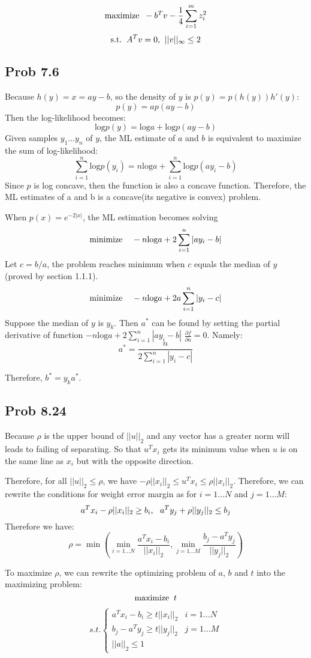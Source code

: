 \message{ !name(ass4_ChangLi.tex)}\documentclass[10pt,a4paper]{article}
\begin{document}
$$\text{maximize\;\;} -b^Tv-\frac{1}{4}\sum_{i=1}^{m}z_i^2$$
$$\text{s.t.\;\;} A^Tv=0\text{,\;\;} ||v||_{\infty}\leq 2$$

\subsection{Prob 7.6}

Because $h(y)=x=ay-b$, so the density of $y$ is
$p(y)=p(h(y))h'(y)$:
$$p(y)= ap(ay-b)$$ 
Then the log-likelihood becomes:
$$ \text{log}p(y) = \text{log}a + \text{log}p(ay-b)$$
Given samples $y_1\dots y_n$ of $y$, the ML estimate of $a$
and $b$ is equivalent to maximize the sum of log-likelihood:
$$\sum_{i=1}^{n}\text{log}p(y_i)=n\text{log}a+\sum_{i=1}^{n}\text{log}p(ay_i-b)$$
Since $p$ is log concave, then the function is also a
concave function. Therefore, the ML estimates of a and b is
a concave(its negative is convex) problem.

When $p(x)=e^{-2|x|}$, the ML estimation becomes solving
$$ \text{minimize\;\;\;\;}-n\text{log}a+2\sum_{i=1}^{n}|ay_i-b|$$
Let $c=b/a$, the problem reaches minimum when $c$ equals the
median of $y$ (proved by section 1.1.1). 
$$ \text{minimize\;\;\;\;}-n\text{log}a+2a\sum_{i=1}^{n}|y_i-c|$$
Suppose the median of $y$ is $y_k$. Then $a^*$ can be found
by setting the partial derivative of function
$-n\text{log}a+2\sum_{i=1}^{n}|ay_i-b|$ $\frac{\partial
  f}{\partial a}=0$. Namely: 
$$a^* = \frac{n}{2\sum_{i=1}^{n}|y_i-c|}$$

Therefore, $b^*=y_ka^*$.


\subsection{Prob 8.24}
Because $\rho$ is the upper bound of $||u||_2$ and any
vector has a greater norm will leads to failing of
separating. So that $u^Tx_i$ gets its minimum value when $u$
is on the same line as $x_i$ but with the opposite
direction.

Therefore, for all $||u||_2\leq \rho$, we have $-\rho ||x_i||_2 \leq
u^Tx_i\leq \rho ||x_i||_2$. Therefore, we can rewrite the
conditions for weight error margin as for $i=1\dots N$ and
$j=1\dots M$:
$$
a^Tx_i-\rho||x_i||_2\geq b_i \text{,\;\;\;}
a^Ty_j+\rho||y_j||_2\leq b_j
$$
Therefore we have:
$$\rho = \min(\min_{i=1\dots
  N}{\frac{a^Tx_i-b_i}{||x_i||_2}},\min_{j=1\dots M}{\frac{b_j-a^Ty_j}{||y_j||_2}})$$

To maximize $\rho$, we can rewrite the optimizing problem of $a$, $b$ and $t$ into the maximizing
problem:
$$\text{maximize\;\;}t$$
\begin{align*}
  s.t.
  \begin{cases}
    a^Tx_i-b_i\geq t||x_i||_2 & i=1\dots N\\
    b_j-a^Ty_j\geq t||y_j||_2 & j=1\dots M\\
    ||a||_2\leq 1
\end{cases}
\end{align*}




	\renewcommand\refname{Bibliography}
	
	
\end{document}
